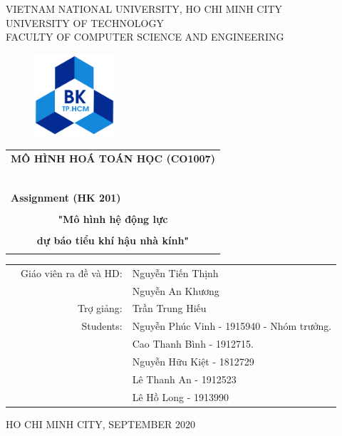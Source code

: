 \documentclass[a4paper]{article}
\begin{document}
\begin{titlepage}
\begin{center}
VIETNAM NATIONAL UNIVERSITY, HO CHI MINH CITY \\
UNIVERSITY OF TECHNOLOGY \\
FACULTY OF COMPUTER SCIENCE AND ENGINEERING
\end{center}

\vspace{1cm}

\begin{figure}[h!]
\begin{center}
\includegraphics[width=3cm]{hcmut.png}
\end{center}
\end{figure}

\vspace{1cm}


\begin{center}
\begin{tabular}{c}
\multicolumn{1}{l}{\textbf{{\Large MÔ HÌNH HOÁ TOÁN HỌC (CO1007)}}}\\
~~\\
\hline
\\
\multicolumn{1}{l}{\textbf{{\Large Assignment (HK 201)}}}\\
\\
\textbf{{\Huge "Mô hình hệ động lực}}\\
\\
\textbf{{\Huge dự báo tiểu khí hậu nhà kính"}}\\
\\
\hline
\end{tabular}
\end{center}

\vspace{2cm}

\begin{table}[h]
\begin{tabular}{rrl}
\hspace{5 cm} & Giáo viên ra đề và HD: & Nguyễn Tiến Thịnh \\ & & Nguyễn An Khương\\
& Trợ giảng: & Trần Trung Hiếu \\
& Students: & Nguyễn Phúc Vinh - 1915940 - Nhóm trưởng. \\
& & Cao Thanh Bình - 1912715. \\
& & Nguyễn Hữu Kiệt - 1812729 \\
& & Lê Thanh An - 1912523\\
& & Lê Hồ Long - 1913990\\
\end{tabular}
\end{table}


\begin{center}
{\footnotesize HO CHI MINH CITY, SEPTEMBER 2020}
\end{center}
\end{titlepage}
\end{document}
